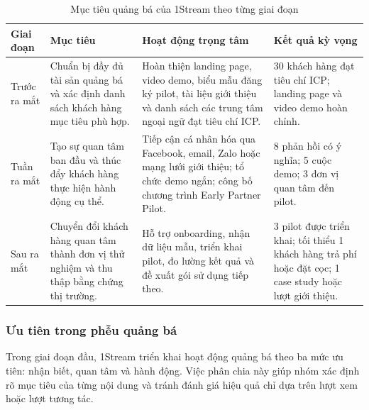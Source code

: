 \begin{table}[htbp]
    \centering
    \caption{Mục tiêu quảng bá của 1Stream theo từng giai đoạn}
    \label{tab:promotion-objectives-by-phase}
    \begin{tabular}{
        p{}
        p{}
        p{}
        p{}
    }
        \hline
        \textbf{Giai đoạn}
        & \textbf{Mục tiêu}
        & \textbf{Hoạt động trọng tâm}
        & \textbf{Kết quả kỳ vọng} \\
        \hline

        Trước ra mắt
        &
        Chuẩn bị đầy đủ tài sản quảng bá và xác định danh sách khách hàng mục tiêu phù hợp.
        &
        Hoàn thiện landing page, video demo, biểu mẫu đăng ký pilot, tài liệu giới thiệu và danh sách các trung tâm ngoại ngữ đạt tiêu chí ICP.
        &
        30 khách hàng đạt tiêu chí ICP; landing page và video demo hoàn chỉnh. \\

        \hline

        Tuần ra mắt
        &
        Tạo sự quan tâm ban đầu và thúc đẩy khách hàng thực hiện hành động cụ thể.
        &
        Tiếp cận cá nhân hóa qua Facebook, email, Zalo hoặc mạng lưới giới thiệu; tổ chức demo ngắn; công bố chương trình Early Partner Pilot.
        &
        8 phản hồi có ý nghĩa; 5 cuộc demo; 3 đơn vị quan tâm đến pilot. \\

        \hline

        Sau ra mắt
        &
        Chuyển đổi khách hàng quan tâm thành đơn vị thử nghiệm và thu thập bằng chứng thị trường.
        &
        Hỗ trợ onboarding, nhận dữ liệu mẫu, triển khai pilot, đo lường kết quả và đề xuất gói sử dụng tiếp theo.
        &
        3 pilot được triển khai; tối thiểu 1 khách hàng trả phí hoặc đặt cọc; 1 case study hoặc lượt giới thiệu. \\

        \hline
    \end{tabular}
\end{table}

\subsubsection{Ưu tiên trong phễu quảng bá}

Trong giai đoạn đầu, 1Stream triển khai hoạt động quảng bá theo ba mức ưu tiên: nhận biết, quan tâm và hành động. Việc phân chia này giúp nhóm xác định rõ mục tiêu của từng nội dung và tránh đánh giá hiệu quả chỉ dựa trên lượt xem hoặc lượt tương tác.


